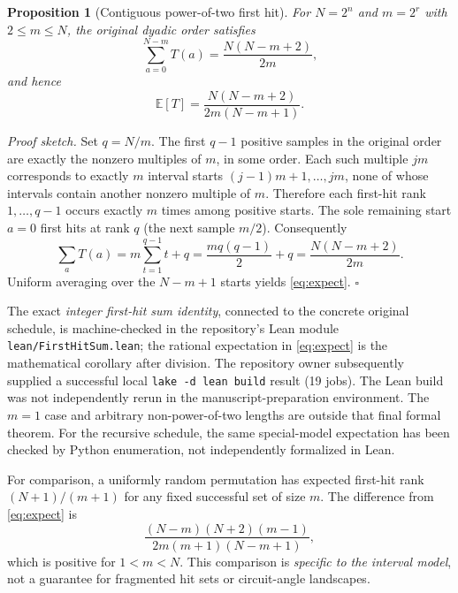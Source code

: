 \documentclass[10pt,a4paper]{article}
\newtheorem{proposition}{Proposition}
\newcommand{\E}{\mathbb{E}}
\begin{document}
\begin{proposition}[Contiguous power-of-two first hit]\label{prop:hit}
For $N=2^n$ and $m=2^r$ with $2\le m\le N$, the original dyadic order satisfies
\begin{equation}\label{eq:sum}
\sum_{a=0}^{N-m}T(a)=\frac{N(N-m+2)}{2m},
\end{equation}
and hence
\begin{equation}\label{eq:expect}
\boxed{\E[T]=\frac{N(N-m+2)}{2m(N-m+1)}.}
\end{equation}
\end{proposition}
\textit{Proof sketch.} Set $q=N/m$. The first $q-1$ positive samples in the original order are exactly the nonzero multiples of $m$, in some order. Each such multiple $jm$ corresponds to exactly $m$ interval starts $(j-1)m+1,\ldots,jm$, none of whose intervals contain another nonzero multiple of $m$. Therefore each first-hit rank $1,\ldots,q-1$ occurs exactly $m$ times among positive starts. The sole remaining start $a=0$ first hits at rank $q$ (the next sample $m/2$). Consequently
\begin{equation}
\sum_a T(a)=m\sum_{t=1}^{q-1}t+q
=\frac{m q(q-1)}2+q
=\frac{N(N-m+2)}{2m}.
\end{equation}
Uniform averaging over the $N-m+1$ starts yields \eqref{eq:expect}. $\square$

The exact \emph{integer first-hit sum identity}, connected to the concrete original schedule, is machine-checked in the repository's Lean module \texttt{lean/FirstHitSum.lean}; the rational expectation in \eqref{eq:expect} is the mathematical corollary after division. The repository owner subsequently supplied a successful local \texttt{lake -d lean build} result (19 jobs). The Lean build was not independently rerun in the manuscript-preparation environment. The $m=1$ case and arbitrary non-power-of-two lengths are outside that final formal theorem. For the recursive schedule, the same special-model expectation has been checked by Python enumeration, not independently formalized in Lean.

For comparison, a uniformly random permutation has expected first-hit rank $(N+1)/(m+1)$ for any fixed successful set of size $m$. The difference from \eqref{eq:expect} is
\begin{equation}
\frac{(N-m)(N+2)(m-1)}{2m(m+1)(N-m+1)},
\end{equation}
which is positive for $1<m<N$. This comparison is \emph{specific to the interval model}, not a guarantee for fragmented hit sets or circuit-angle landscapes.
\end{document}
